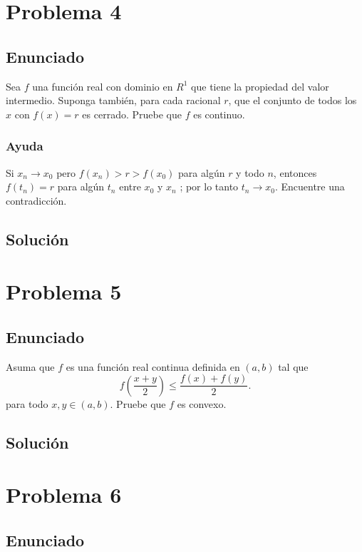 \documentclass{report}
\begin{document}
\chapter{Problema 4}
\section{Enunciado}


Sea $f$ una función real con dominio en $R^{1}$ que tiene la propiedad del valor intermedio. Suponga también, para cada racional $r$, que el conjunto de todos los $x$ con $f(x)=r$ es cerrado. Pruebe que $f$ es continuo.

\subsection{Ayuda}
Si $x_n \to x_0$ pero $f\left( x_n \right) > r > f\left( x_0 \right) $ para algún $r$ y todo $n$, entonces  $f\left( t_n \right) = r$ para algún $t_n$ entre $x_0$ y $x_n$ ; por lo tanto $t_n \to  x_0$. Encuentre una contradicción.

\section{Solución}

\chapter{Problema 5}
\section{Enunciado}

Asuma que $f$ es una función real continua definida en $\left( a, b \right) $ tal que \[
f\left( \frac{x + y}{2} \right) \le \frac{f(x) + f(y)}{2}
.\] para todo $x, y \in \left( a,b \right) $. Pruebe que $f$ es convexo.
\section{Solución}


\chapter{Problema 6}
\section{Enunciado}
\end{document}
